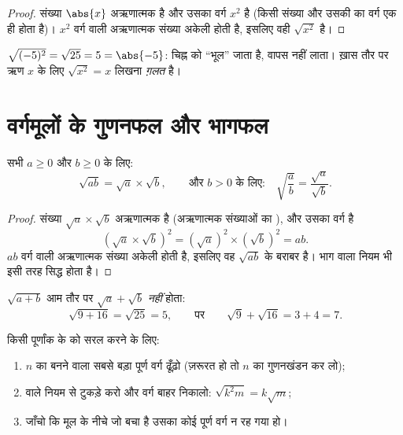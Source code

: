 \begin{proof}
संख्या $\abs{x}$ अऋणात्मक है और उसका वर्ग $x^2$ है (किसी संख्या और
उसकी  का वर्ग एक ही होता है)। $x^2$ वर्ग वाली अऋणात्मक
संख्या अकेली होती है, इसलिए वही $\sqrt{x^2}$ है।
\end{proof}

\begin{example}
$\sqrt{(-5)^2} = \sqrt{25} = 5 = \abs{-5}$:  चिह्न को ``भूल''
जाता है, वापस नहीं लाता। ख़ास तौर पर ऋण $x$ के लिए $\sqrt{x^2} = x$
लिखना \emph{ग़लत} है।
\end{example}

\section{वर्गमूलों के गुणनफल और भागफल}

\begin{theorem}[गुणा और भाग के नियम]\label{thm:g9:sqrt:rules}
सभी $a \geq 0$ और $b \geq 0$ के लिए:
\[
\sqrt{a b} = \sqrt a \times \sqrt b,
\qquad\text{और } b > 0 \text{ के लिए:}\quad
\sqrt{\frac ab} = \frac{\sqrt a}{\sqrt b} .
\]
\end{theorem}

\begin{proof}
संख्या $\sqrt a \times \sqrt b$ अऋणात्मक है (अऋणात्मक संख्याओं का
), और उसका वर्ग है
\[
\left(\sqrt a \times \sqrt b\right)^2
= \left(\sqrt a\right)^2 \times \left(\sqrt b\right)^2
= a b .
\]
$ab$ वर्ग वाली अऋणात्मक संख्या अकेली होती है, इसलिए वह $\sqrt{ab}$ के
बराबर है। भाग वाला नियम भी इसी तरह सिद्ध होता है।
\end{proof}

\begin{remark}[योग के लिए ऐसा कोई नियम नहीं!]
$\sqrt{a + b}$ आम तौर पर $\sqrt a + \sqrt b$ \emph{नहीं} होता:
\[
\sqrt{9 + 16} = \sqrt{25} = 5,
\qquad\text{पर}\qquad
\sqrt 9 + \sqrt{16} = 3 + 4 = 7 .
\]
\end{remark}

\begin{method}\label{met:g9:sqrt:simplify}
किसी पूर्णांक के  को सरल करने के लिए:
\begin{enumerate}
  \item $n$ का  बनने वाला सबसे बड़ा पूर्ण वर्ग ढूँढ़ो (ज़रूरत हो तो
        $n$ का गुणनखंडन कर लो);
  \item {} वाले नियम से टुकड़े करो और वर्ग बाहर निकालो:
        $\sqrt{k^2 m} = k\sqrt m$;
  \item जाँचो कि मूल के नीचे जो बचा है उसका कोई पूर्ण वर्ग  न
        रह गया हो।
\end{enumerate}
\end{method}

